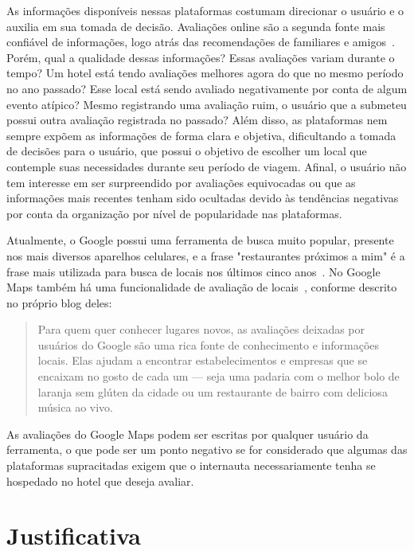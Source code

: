 As informações disponíveis nessas plataformas costumam direcionar o usuário e o auxilia em sua tomada de decisão. Avaliações online são a segunda fonte mais confiável de informações, logo atrás das recomendações de familiares e amigos~\cite{chatterjee2020drivers}. Porém, qual a qualidade dessas informações? Essas avaliações variam durante o tempo? Um hotel está tendo avaliações melhores agora do que no mesmo período no ano passado? Esse local está sendo avaliado negativamente por conta de algum evento atípico? Mesmo registrando uma avaliação ruim, o usuário que a submeteu possui outra avaliação registrada no passado?
Além disso, as plataformas nem sempre expõem as informações de forma clara e objetiva, dificultando a tomada de decisões para o usuário, que possui o objetivo de escolher um local que contemple suas necessidades durante seu período de viagem. Afinal, o usuário não tem interesse em ser surpreendido por avaliações equivocadas ou que as informações mais recentes tenham sido ocultadas devido às tendências negativas por conta da organização por nível de popularidade nas plataformas.

Atualmente, o Google possui uma ferramenta de busca muito popular, presente nos mais diversos aparelhos celulares, e a frase "restaurantes próximos a mim" é a frase mais utilizada para busca de locais nos últimos cinco anos~\cite{li20213}. No Google Maps também há uma funcionalidade de avaliação de locais~\cite{googleMaps2022Blog}, conforme descrito no próprio blog deles:

\begin{quote}
    Para quem quer conhecer lugares novos, as avaliações deixadas por usuários do Google são uma rica fonte de conhecimento e informações locais. Elas ajudam a encontrar estabelecimentos e empresas que se encaixam no gosto de cada um — seja uma padaria com o melhor bolo de laranja sem glúten da cidade ou um restaurante de bairro com deliciosa música ao vivo.
\end{quote}

As avaliações do Google Maps podem ser escritas por qualquer usuário da ferramenta, o que pode ser um ponto negativo se for considerado que algumas das plataformas supracitadas exigem que o internauta necessariamente tenha se hospedado no hotel que deseja avaliar.

\section{Justificativa}

